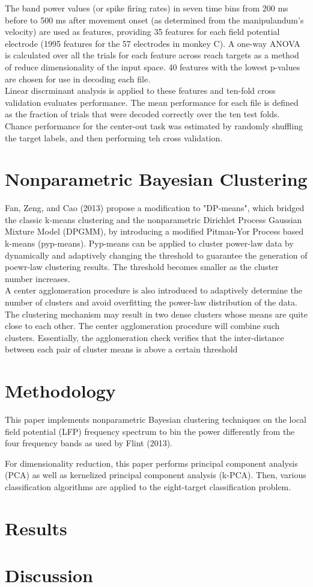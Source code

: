 \documentclass{article}
\begin{document}
\noindent
The band power values (or spike firing rates) in seven time bins from 200 ms before to 500 ms after movement onset (as determined from the manipulandum's velocity) are used as features, providing 35 features for each field potential electrode (1995 features for the 57 electrodes in monkey C).  A one-way ANOVA is calculated over all the trials for each feature across reach targets as a method of reduce dimensionality of the input space.  40 features with the lowest p-values are chosen for use in decoding each file.  \\

\noindent
Linear discrminant analysis is applied to these features and ten-fold cross validation evaluates performance.  The mean performance for each file is defined as the fraction of trials that were decoded correctly over the ten test folds.  Chance performance for the center-out task was estimated by randomly shuffling the target labels, and then performing teh cross validation.

\section{Nonparametric Bayesian Clustering}
\noindent
Fan, Zeng, and Cao (2013) propose a modification to "DP-means", which bridged the classic k-means clustering and the nonparametric Dirichlet Process Gaussian Mixture Model (DPGMM), by introducing a modified Pitman-Yor Process based k-means (pyp-means).  Pyp-means can be applied to cluster power-law data by dynamically and adaptively changing the threshold to guarantee the generation of poewr-law clustering results.  The threshold becomes smaller as the cluster number increases.  \\

\noindent
A center agglomeration procedure is also introduced to adaptively determine the number of clusters and avoid overfitting the power-law distribution of the data.  The clustering mechanism may result in two dense clusters whose means are quite close to each other.  The center agglomeration procedure will combine such clusters.  Essentially, the agglomeration check verifies that the inter-distance between each pair of cluster means is above a certain threshold 


\section{Methodology}
This paper implements nonparametric Bayesian clustering techniques on the local field potential (LFP) frequency spectrum to bin the power differently from the four frequency bands as used by Flint (2013).  

For dimensionality reduction, this paper performs principal component analysis (PCA) as well as kernelized principal component analysis (k-PCA).  Then, various classification algorithms are applied to the eight-target classification problem.	


\section{Results}

\section{Discussion}
\end{document}
